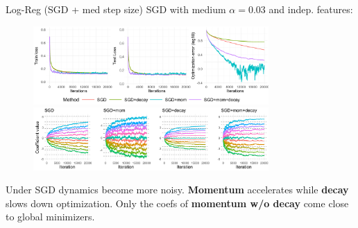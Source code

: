 \documentclass[11pt,compress,t,notes=noshow, xcolor=table]{beamer}
\begin{document}
\begin{vbframe}{Log-Reg (SGD + med step size)}
\vspace{-0.4cm}
SGD with medium $\alpha=0.03$ and indep. features:
\begin{figure}
            \includegraphics[width=0.8\textwidth]{figure_man/simu_linmod/SGD_log_med_lr_iters.pdf} \\
             \includegraphics[width=0.8\textwidth]{figure_man/simu_linmod/SGD_log_coef_med.pdf}\\
            \begin{footnotesize}
            \end{footnotesize}
\end{figure}
Under SGD dynamics become more noisy. \textbf{Momentum} accelerates while \textbf{decay} slows down optimization. Only the coefs of \textbf{momentum w/o decay} come close to global minimizers.
\end{vbframe}
\end{document}
